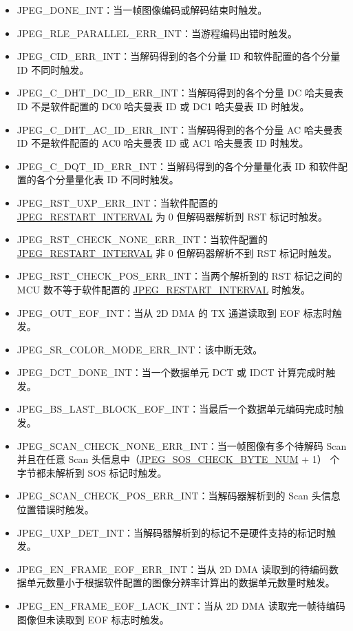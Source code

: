 \documentclass[main\_\_CN.tex]{subfiles}
\begin{document}
\begin{itemize}
\item JPEG\_DONE\_INT：当一帧图像编码或解码结束时触发。
\item JPEG\_RLE\_PARALLEL\_ERR\_INT：当游程编码出错时触发。
\item JPEG\_CID\_ERR\_INT：当解码得到的各个分量 ID 和软件配置的各个分量 ID 不同时触发。
\item JPEG\_C\_DHT\_DC\_ID\_ERR\_INT：当解码得到的各个分量 DC 哈夫曼表 ID 不是软件配置的 DC0 哈夫曼表 ID 或 DC1 哈夫曼表 ID 时触发。
\item JPEG\_C\_DHT\_AC\_ID\_ERR\_INT：当解码得到的各个分量 AC 哈夫曼表 ID 不是软件配置的 AC0 哈夫曼表 ID 或 AC1 哈夫曼表 ID 时触发。
\item JPEG\_C\_DQT\_ID\_ERR\_INT：当解码得到的各个分量量化表 ID 和软件配置的各个分量量化表 ID 不同时触发。
\item JPEG\_RST\_UXP\_ERR\_INT：当软件配置的 \hyperref[fielddesc:JPEGRESTARTINTERVAL]{JPEG\_RESTART\_INTERVAL} 为 0 但解码器解析到 RST 标记时触发。
\item JPEG\_RST\_CHECK\_NONE\_ERR\_INT：当软件配置的 \hyperref[fielddesc:JPEGRESTARTINTERVAL]{JPEG\_RESTART\_INTERVAL} 非 0 但解码器解析不到 RST 标记时触发。
\item JPEG\_RST\_CHECK\_POS\_ERR\_INT：当两个解析到的 RST 标记之间的 MCU 数不等于软件配置的 \hyperref[fielddesc:JPEGRESTARTINTERVAL]{JPEG\_RESTART\_INTERVAL} 时触发。
\item JPEG\_OUT\_EOF\_INT：当从 2D DMA 的 TX 通道读取到 EOF 标志时触发。
\item JPEG\_SR\_COLOR\_MODE\_ERR\_INT：该中断无效。
\item JPEG\_DCT\_DONE\_INT：当一个数据单元 DCT 或 IDCT 计算完成时触发。
\item JPEG\_BS\_LAST\_BLOCK\_EOF\_INT：当最后一个数据单元编码完成时触发。
\item JPEG\_SCAN\_CHECK\_NONE\_ERR\_INT：当一帧图像有多个待解码 Scan 并且在任意 Scan 头信息中（\hyperref[fielddesc:JPEGSOSCHECKBYTENUM]{JPEG\_SOS\_CHECK\_BYTE\_NUM} + 1） 个字节都未解析到 SOS 标记时触发。
\item JPEG\_SCAN\_CHECK\_POS\_ERR\_INT：当解码器解析到的 Scan 头信息位置错误时触发。
\item JPEG\_UXP\_DET\_INT：当解码器解析到的标记不是硬件支持的标记时触发。
\item JPEG\_EN\_FRAME\_EOF\_ERR\_INT：当从 2D DMA 读取到的待编码数据单元数量小于根据软件配置的图像分辨率计算出的数据单元数量时触发。
\item JPEG\_EN\_FRAME\_EOF\_LACK\_INT：当从 2D DMA 读取完一帧待编码图像但未读取到 EOF 标志时触发。

\end{itemize}
\end{document}
